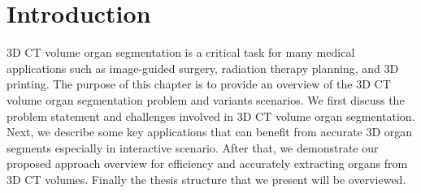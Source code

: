 \chapter{Introduction}
\label{chap-introduction}
\begin{ChapAbstract}



3D CT volume organ segmentation is a critical task for many medical applications such as image-guided surgery, radiation therapy planning, and 3D printing. The purpose of this chapter is to provide an overview of the 3D CT volume organ segmentation problem and variants scenarios. We first discuss the problem statement and challenges involved in 3D CT volume organ segmentation. Next, we describe some key applications that can benefit from accurate 3D organ segments especially in interactive scenario. After that, we demonstrate our proposed approach overview for efficiency and accurately extracting organs from 3D CT volumes. Finally the thesis structure that we present will be overviewed.

\end{ChapAbstract}



% 




